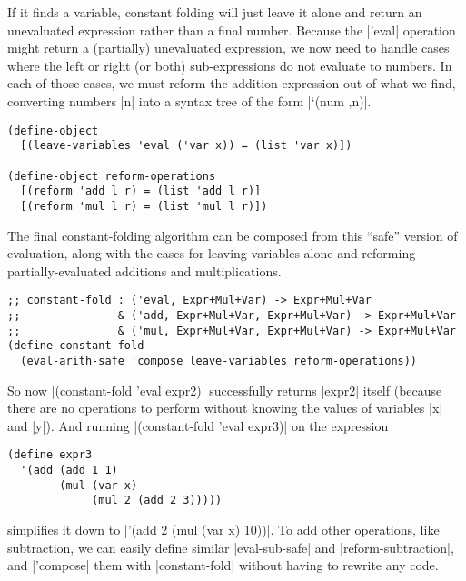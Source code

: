 If it finds a variable, constant folding will just leave it alone and return an unevaluated expression rather than a final number.
Because the \scm|'eval| operation might return a (partially) unevaluated expression, we now need to handle cases where the left or right (or both) sub-expressions do not evaluate to numbers.
In each of those cases, we must reform the addition expression out of what we find, converting numbers \scm|n| into a syntax tree of the form \scm|`(num ,n)|.
\begin{verbatim}
(define-object
  [(leave-variables 'eval ('var x)) = (list 'var x)])

(define-object reform-operations
  [(reform 'add l r) = (list 'add l r)]
  [(reform 'mul l r) = (list 'mul l r)])
\end{verbatim}
The final constant-folding algorithm can be composed from this ``safe'' version of evaluation, along with the cases for leaving variables alone and reforming partially-evaluated additions and multiplications.
\begin{verbatim}
;; constant-fold : ('eval, Expr+Mul+Var) -> Expr+Mul+Var
;;               & ('add, Expr+Mul+Var, Expr+Mul+Var) -> Expr+Mul+Var
;;               & ('mul, Expr+Mul+Var, Expr+Mul+Var) -> Expr+Mul+Var
(define constant-fold
  (eval-arith-safe 'compose leave-variables reform-operations))
\end{verbatim}
So now \scm|(constant-fold 'eval expr2)| successfully returns \scm|expr2| itself (because there are no operations to perform without knowing the values of variables \scm|x| and \scm|y|).
And running \scm|(constant-fold 'eval expr3)| on the expression
\begin{verbatim}
(define expr3
  '(add (add 1 1)
        (mul (var x)
             (mul 2 (add 2 3)))))
\end{verbatim}
simplifies it down to \scm|'(add 2 (mul (var x) 10))|.
To add other operations, like subtraction, we can easily define similar \scm|eval-sub-safe| and \scm|reform-subtraction|, and \scm|'compose| them with \scm|constant-fold| without having to rewrite any code.

